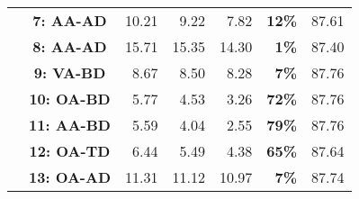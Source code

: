 \begin{table*}[!ht]
\begin{tabular}{c|c|rrrr|r}
    & \raggedright\textbf{\textcolor{purple!70}{\phantom{*}7: AA-AD}} & 10.21 & 9.22 & 7.82 & \textcolor{t12!100}{\textbf{12\%}} & 87.61 \\
    & \raggedright\textbf{\textcolor{teal!70}{\phantom{*}8: AA-AD}} & 15.71 & 15.35 & 14.30 & \textcolor{t1!100}{\textbf{1\%}} & 87.40 \\
    \cline{2-7}
    & \raggedright\textbf{\textcolor{orange!70}{\phantom{*}9: VA-BD}} & 8.67 & 8.50 & 8.28 & \textcolor{t7!100}{\textbf{7\%}} & 87.76 \\
    & \raggedright\textbf{\textcolor{purple!70}{10: OA-BD}} & 5.77 & 4.53 & 3.26 & \textcolor{t72!100}{\textbf{72\%}} & 87.76 \\
    & \raggedright\textbf{\textcolor{purple!70}{11: AA-BD}} & 5.59 & 4.04 & 2.55 & \textcolor{t79!100}{\textbf{79\%}} & 87.76 \\
    & \raggedright\textbf{\textcolor{teal!70}{12: OA-TD}} & 6.44 & 5.49 & 4.38 & \textcolor{t65!100}{\textbf{65\%}} & 87.64 \\
    & \raggedright\textbf{\textcolor{teal!70}{13: OA-AD}} & 11.31 & 11.12 & 10.97 & \textcolor{t7!100}{\textbf{7\%}} & 87.74 \\
    \bottomrule
  \end{tabular}
  \label{tab:HSJA_result}
\end{table*}

